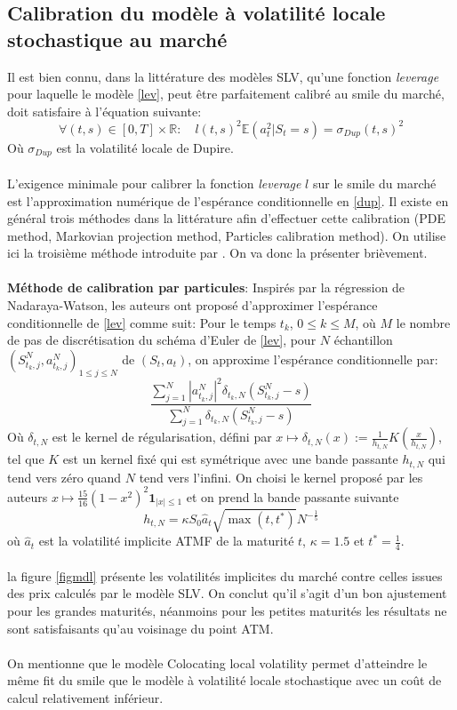 \documentclass[a4paper,12pt]{report}
\numberwithin{equation}{section}
\theoremstyle{definition}
\numberwithin{equation}{section}
\begin{document}
\subsection{Calibration du modèle à volatilité locale stochastique au marché}
Il est bien connu, dans la littérature des modèles SLV, qu'une fonction \textit{leverage} pour laquelle le modèle \ref{lev}, peut être parfaitement calibré au smile du marché, doit satisfaire à l'équation suivante:
\begin{equation}
\label{dup}
\forall (t, s) \in [0,T]\times \mathbb{R}:\quad l(t,s)^2 \mathbb{E} \left( a_t^2 | S_t = s \right) = \sigma_{Dup}(t,s)^2
\end{equation}
Où $\sigma_{Dup}$ est la volatilité locale de Dupire.\\\\ L'exigence minimale pour calibrer la fonction \textit{leverage} $l$ sur le smile du marché est l'approximation numérique de l'espérance conditionnelle en \ref{dup}. Il existe en général trois méthodes dans la littérature afin d'effectuer cette calibration (PDE method, Markovian projection method, Particles calibration method). On utilise ici la troisième méthode introduite par \cite{Guyon}. On va donc la présenter brièvement.\\\\
\textbf{Méthode de calibration par particules}: Inspirés par la régression de Nadaraya-Watson, les auteurs \cite{Guyon} ont proposé d'approximer l'espérance conditionnelle de \ref{lev} comme suit: Pour le temps $t_k$, $0\leq k \leq M$, où $M$ le nombre de pas de discrétisation du schéma d'Euler de \ref{lev}, pour $N$ échantillon $\left( S_{t_k,j}^N, a_{t_k,j}^N \right)_{1\leq j \leq N}$ de $\left( S_t, a_t\right)$, on approxime l'espérance conditionnelle par:
\begin{equation}
\displaystyle \frac{\displaystyle \sum_{j=1}^{N} |a_{t_k,j}^N|^2 \delta_{t_k, N} \left(  S_{t_k,j}^N - s \right)}{\displaystyle \sum_{j=1}^{N} \delta_{t_k, N} \left(  S_{t_k,j}^N - s \right)}
\end{equation}
Où $\delta_{t,N}$ est le kernel de régularisation, défini par $x \mapsto \delta_{t,N}(x):= \frac{1}{h_{t,N}}K\left( \frac{x}{h_{t,N}} \right)$, tel que $K$ est un kernel fixé qui est symétrique avec une bande passante $h_{t,N}$ qui tend vers zéro quand $N$ tend vers l'infini. On choisi le kernel proposé par les auteurs \cite{Guyon} $x\mapsto \frac{15}{16}(1-x^2)^2 \textbf{1}_{|x|\leq 1}$ et on prend la bande passante suivante
$$h_{t,N}=\kappa S_0 \hat{a}_t \sqrt{\max(t,t^*)}N^{-\frac{1}{5}}$$
où $\hat{a}_t$ est la volatilité implicite ATMF de la maturité $t$, $\kappa=1.5$ et $t^* = \frac{1}{4}$. 
\\\\
la figure \ref{figmdl} présente les volatilités implicites du marché contre celles issues des prix calculés par le modèle SLV. On conclut qu'il s'agit d'un bon ajustement pour les grandes maturités, néanmoins pour les petites maturités les résultats ne sont satisfaisants qu'au voisinage du point ATM. \\\\
On mentionne que le modèle Colocating local volatility permet d'atteindre le même fit du smile que le modèle à volatilité locale stochastique avec un coût de calcul relativement inférieur.
\end{document}

